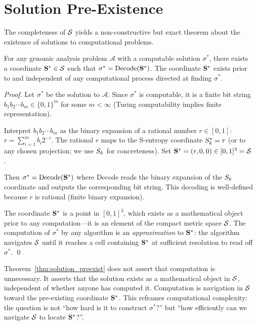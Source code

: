 \section{Solution Pre-Existence}
\label{sec:solution_preexistence}

The completeness of $\mathcal{S}$ yields a non-constructive but exact theorem
about the existence of solutions to computational problems.

\begin{theorem}
\label{thm:solution_preexist}
For any genomic analysis problem $\mathcal{A}$ with a computable solution
$\sigma^*$, there exists a coordinate $\mathbf{S}^* \in \mathcal{S}$ such that
$\sigma^* = \mathrm{Decode}(\mathbf{S}^*)$. The coordinate $\mathbf{S}^*$ exists
prior to and independent of any computational process directed at finding
$\sigma^*$.
\end{theorem}

\begin{proof}
Let $\sigma^*$ be the solution to $\mathcal{A}$. Since $\sigma^*$ is computable,
it is a finite bit string $b_1 b_2 \cdots b_m \in \{0,1\}^m$ for some $m < \infty$
(Turing computability implies finite representation).

Interpret $b_1 b_2 \cdots b_m$ as the binary expansion of a rational number
$r \in [0,1]$: $r = \sum_{i=1}^m b_i 2^{-i}$. The rational $r$ maps to the
S-entropy coordinate $S_k^* = r$ (or to any chosen projection; we use $S_k$
for concreteness). Set $\mathbf{S}^* = (r, 0, 0) \in [0,1]^3 = \mathcal{S}$.

Then $\sigma^* = \mathrm{Decode}(\mathbf{S}^*)$ where $\mathrm{Decode}$ reads
the binary expansion of the $S_k$ coordinate and outputs the corresponding bit
string. This decoding is well-defined because $r$ is rational (finite binary
expansion).

The coordinate $\mathbf{S}^*$ is a point in $[0,1]^3$, which exists as a
mathematical object prior to any computation---it is an element of the compact
metric space $\mathcal{S}$. The computation of $\sigma^*$ by any algorithm is
an \emph{approximation} to $\mathbf{S}^*$: the algorithm navigates $\mathcal{S}$
until it reaches a cell containing $\mathbf{S}^*$ at sufficient resolution to
read off $\sigma^*$. \qed
\end{proof}

\begin{remark}
Theorem~\ref{thm:solution_preexist} does not assert that computation is
unnecessary. It asserts that the solution exists as a mathematical object in
$\mathcal{S}$, independent of whether anyone has computed it. Computation is
navigation in $\mathcal{S}$ toward the pre-existing coordinate $\mathbf{S}^*$.
This reframes computational complexity: the question is not ``how hard is it
to construct $\sigma^*$?'' but ``how efficiently can we navigate $\mathcal{S}$
to locate $\mathbf{S}^*$?''.
\end{remark}

